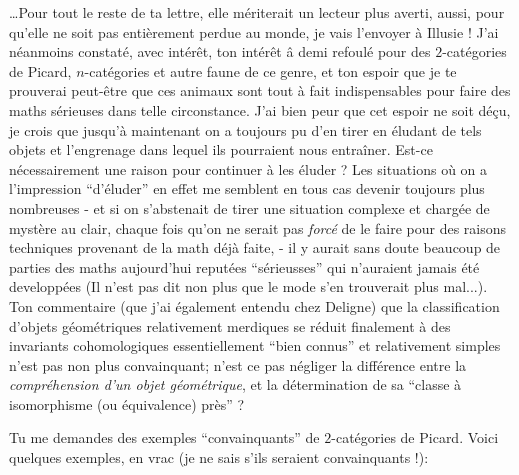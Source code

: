 \label{sec:app1}%
\dots Pour tout le reste de ta lettre, elle mériterait un lecteur plus averti, aussi, pour qu'elle ne soit pas entièrement perdue au monde, je vais l'envoyer à Illusie ! J'ai néanmoins constaté, avec intérêt, ton intérêt â demi refoulé pour des $2$-catégories de Picard, $n$-catégories et autre faune de ce genre, et ton espoir que je te prouverai peut-être que ces animaux sont tout à fait indispensables pour faire des maths sérieuses dans telle circonstance. J'ai bien peur que cet espoir ne soit dé\c{c}u, je crois que jusqu'à maintenant on a toujours pu d'en tirer en éludant de tels objets et l'engrenage dans lequel ils pourraient nous entraîner. Est-ce nécessairement une raison pour continuer à les éluder ? Les situations où on a l'impression ``d'éluder'' en effet me semblent en tous cas devenir toujours plus nombreuses - et si on s'abstenait de tirer une situation complexe et chargée de mystère au clair, chaque fois qu'on ne serait pas \emph{forcé} de le faire pour des raisons techniques provenant de la math déjà faite, - il y aurait sans doute beaucoup de parties des maths aujourd'hui reputées ``sérieusses'' qui n'auraient jamais été developpées (Il n'est pas dit non plus que le mode s'en trouverait plus mal...). Ton commentaire (que j'ai également entendu chez Deligne) que la classification d'objets géométriques relativement merdiques se réduit finalement à des invariants cohomologiques essentiellement ``bien connus'' et relativement simples n'est pas non plus convainquant; n'est ce pas négliger la différence entre la \emph{compréhension d'un objet géométrique}, et la détermination de sa ``classe à isomorphisme (ou équivalence) près'' ?

Tu me demandes des exemples ``convainquants'' de $2$-catégories de Picard. Voici quelques exemples, en vrac (je ne sais s'ils seraient convainquants !):

